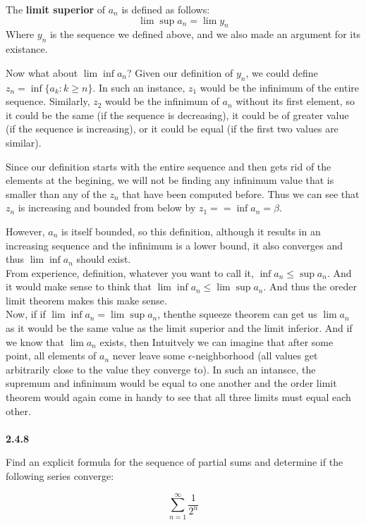 The \textbf{limit superior} of $a_n$ is defined as follows:
$$
\lim \sup a_n = \lim y_n
$$
Where $y_n$ is the sequence we defined above, and we also made an argument for its existance.

Now what about $\lim \inf a_n$?
Given our definition of $y_n$, we could define $z_n = \inf\{a_k : k\geq n\}$.
In such an instance, $z_1$ would be the infinimum of the entire sequence.
Similarly, $z_2$ would be the infinimum of $a_n$ without its first element, so it could be the same
(if the sequence is decreasing), it could be of greater value (if the sequence is increasing),
or it could be equal (if the first two values are similar).

Since our definition starts with the entire sequence and then gets rid of the elements at the begining,
we will not be finding any infinimum value that is smaller than any of the $z_n$ that have been computed before.
Thus we can see that $z_n$ is increasing and bounded from below by $z_1 = = \inf a_n = \beta$.

However, $a_n$ is itself bounded, so this definition, although it results in an increasing sequence
and the infinimum is a lower bound, it also converges and thus $\lim \inf a_n$ should exist.
\\

From experience, definition, whatever you want to call it, $\inf a_n \leq \sup a_n$.
And it would make sense to think that $\lim \inf a_n \leq \lim \sup a_n$.
And thus the oreder limit theorem makes this make sense.
\\

Now, if if $\lim \inf a_n = \lim \sup a_n$, thenthe squeeze theorem can get us $\lim a_n$ as it would
be the same value as the limit superior and the limit inferior.
And if we know that $\lim a_n$ exists, then Intuitvely we can imagine that after some point, all elements
of $a_n$ never leave some $\epsilon$-neighborhood (all values get arbitrarily close to the value they converge to).
In such an intansce, the supremum and infinimum would be equal to one another and the order limit theorem
would again come in handy to see that all three limits must equal each other.
\\~\\



\textbf{2.4.8}

Find an explicit formula for the sequence of partial sums and determine if the following series converge:

$$
\sum^{\infty}_{n=1} \frac{1}{2^n}
$$

